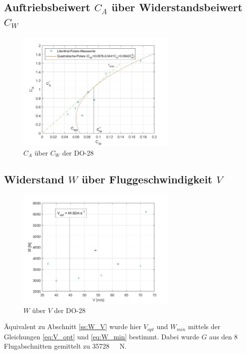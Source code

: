 \subsection{Auftriebsbeiwert $C_{A}$ über Widerstandsbeiwert $C_{W}$}

\begin{figure}[H]
	\centering	\includegraphics[width=0.7\textwidth]{./Bilder/CA_CW_DO28_NEU.jpg}
	\caption{$C_{A}$ über $C_{W}$ der DO-28}
	\label{fig:CA_CW_DO28}
\end{figure}

\subsection{Widerstand $W$ über Fluggeschwindigkeit $V$}

\begin{figure}[H]
	\centering	\includegraphics[width=0.7\textwidth]{./Bilder/W_V_DO28_NEU.jpg}
	\caption{$W$ über $V$ der DO-28}
	\label{fig:W_V_DO28}
\end{figure}

Äquivalent zu Abschnitt \ref{ss:W_V} wurde hier $V_{opt}$ und $W_{min}$ mittels der Gleichungen \ref{eq:V_opt} und \ref{eq:W_min} bestimmt. Dabei wurde $G$ aus den 8 Flugabschnitten gemittelt zu \SI{35728}{\ \newton}.


